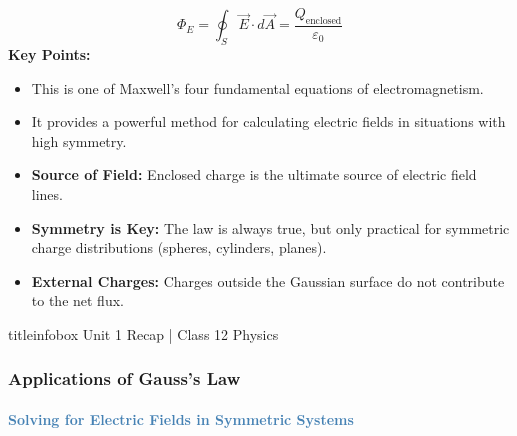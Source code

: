 \begin{frame}
\begin{frame}
\begin{formulabox}
\vspace{0.2cm}
\begin{equation*}
\Phi_E = \oint_S \vec{E} \cdot d\vec{A} = \frac{Q_{\text{enclosed}}}{\varepsilon_0}
\end{equation*}
\vspace{0.15cm}
\textbf{Key Points:}
\begin{itemize}
    \item This is one of Maxwell's four fundamental equations of electromagnetism.
    \item It provides a powerful method for calculating electric fields in situations with high symmetry.
\end{itemize}
\end{formulabox}

\vspace{0.35cm}

\begin{examplebox}
\vspace{0.1cm}
\begin{itemize}
    \item \textbf{Source of Field:} Enclosed charge is the ultimate source of electric field lines.
    \item \textbf{Symmetry is Key:} The law is always true, but only practical for symmetric charge distributions (spheres, cylinders, planes).
    \item \textbf{External Charges:} Charges outside the Gaussian surface do not contribute to the net flux.
\end{itemize}
\vspace{0.1cm}
\end{examplebox}

\vfill

\begin{beamercolorbox}[wd=\textwidth,ht=0.5cm,dp=0.1cm,center]{titleinfobox}
    \small\color{coolgray} Unit 1 Recap | Class 12 Physics
\end{beamercolorbox}
\end{frame}

\begin{frame}
\frametitle{\textsf{\textbf{Applications of Gauss's Law}}}
\framesubtitle{\textcolor{steelblue}{Solving for Electric Fields in Symmetric Systems}}


\end{frame}
\end{frame}
